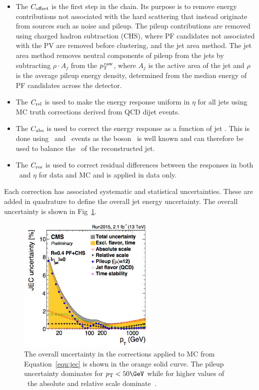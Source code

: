 \begin{itemize}
\item The $C_{\rm{offset}}$ is the first step in the chain. Its purpose is to remove
energy contributions not associated with the hard scattering that instead originate from sources
such as noise and pileup. The pileup contributions are removed using charged
hadron subtraction (CHS), where PF candidates not associated with the PV
are removed before clustering, and the jet area method. The jet area method removes neutral components
of pileup from the jets by subtracting $\rho \cdot A_j$
from the $p^{\,\rm{raw}}_{\rm{T}}$, where $A_j$ is the active area of the jet and $\rho$ 
is the average pileup energy density, determined from the median energy of PF candidates
across the detector. 
\item The $C_{\rm{rel}}$ is used to make the energy response uniform in $\eta$ for all jets using MC truth corrections derived from QCD dijet events.
\item The $C_{\rm{abs}}$ is used to correct the energy response as a function of jet \pt. This is done using \zj~and \gj~events as
the boson \pt~is well known and can therefore be used to balance the \pt~of the reconstructed jet.
\item The $C_{\rm{res}}$ is used to correct residual differences between the responses in both \pt~and $\eta$ for data and MC and is applied in data only.
\end{itemize}

Each correction has associated systematic and statistical uncertainties. These are added in quadrature to define the overall jet energy uncertainty. The 
overall uncertainty is shown in Fig~\ref{fig:jec_unc}.

\begin{figure}
\centering
    \includegraphics[width=0.6\textwidth]{./Figures/reconstruction/jec_unc.png}
  \caption{\label{fig:jec_unc} The overall uncertainty in the corrections applied to MC from Equation~\ref{equ:jec} is 
  shown in the orange solid curve. The pileup uncertainty dominates for $\pt < 50\GeV$ while for higher values of \pt~the absolute and relative scale dominate~\cite{jec_fig}.}
\end{figure}

